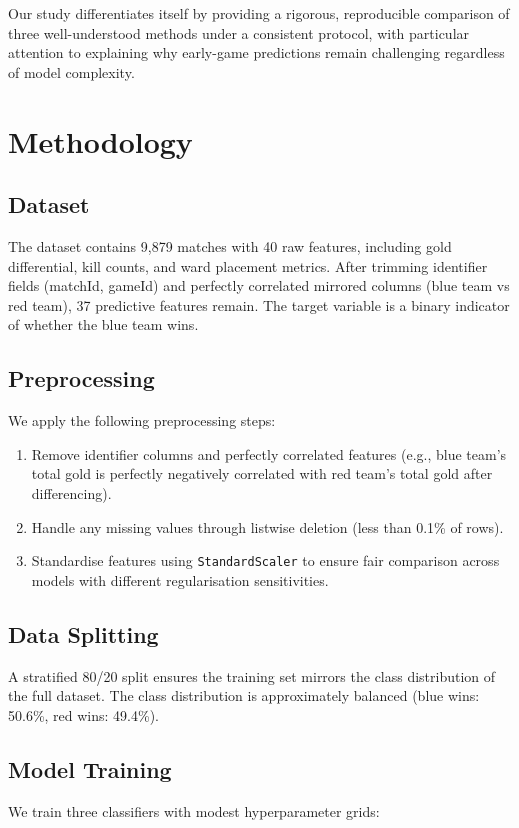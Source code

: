 \documentclass[runningheads]{llncs}
\begin{document}
Our study differentiates itself by providing a rigorous, reproducible comparison of three well-understood methods under a consistent protocol, with particular attention to explaining why early-game predictions remain challenging regardless of model complexity.

\section{Methodology}
\subsection{Dataset}
The dataset contains 9,879 matches with 40 raw features, including gold differential, kill counts, and ward placement metrics. After trimming identifier fields (matchId, gameId) and perfectly correlated mirrored columns (blue team vs red team), 37 predictive features remain. The target variable is a binary indicator of whether the blue team wins.

\subsection{Preprocessing}
We apply the following preprocessing steps:
\begin{enumerate}
\item Remove identifier columns and perfectly correlated features (e.g., blue team's total gold is perfectly negatively correlated with red team's total gold after differencing).
\item Handle any missing values through listwise deletion (less than 0.1\% of rows).
\item Standardise features using \texttt{StandardScaler} to ensure fair comparison across models with different regularisation sensitivities.
\end{enumerate}

\subsection{Data Splitting}
A stratified 80/20 split ensures the training set mirrors the class distribution of the full dataset. The class distribution is approximately balanced (blue wins: 50.6\%, red wins: 49.4\%).

\subsection{Model Training}
We train three classifiers with modest hyperparameter grids:
\end{document}
